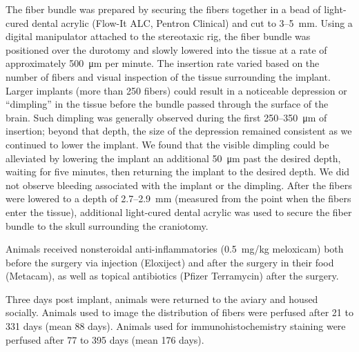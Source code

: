The fiber bundle was prepared by securing the fibers together in a 
bead of light-cured 
dental acrylic (Flow-It ALC, Pentron Clinical) and cut to 3--5~mm. Using 
a digital manipulator attached to the stereotaxic rig, the fiber bundle 
was positioned over the durotomy and slowly lowered into the tissue at 
a rate of approximately 500~\si{\micro\meter} per minute. The insertion rate varied 
based on the number of fibers and visual inspection of the tissue 
surrounding the implant. Larger implants (more than 250 fibers) could 
result in a noticeable depression or ``dimpling'' in the tissue before 
the bundle passed through the surface of the brain. Such dimpling was 
generally observed during the first 250--350~\si{\micro\meter} of 
insertion; beyond that depth, the size of the depression remained 
consistent as we continued to lower the implant. We found that the 
visible dimpling could be alleviated by lowering the implant an 
additional 50~\si{\micro\meter} past the desired depth, waiting for five 
minutes, then returning the implant to the desired depth. We did not 
observe bleeding 
associated with the implant or the dimpling. After the fibers 
were lowered to a depth of 2.7--2.9~mm (measured from the point when the 
fibers enter the tissue), additional light-cured dental acrylic was used 
to secure the fiber bundle to the skull surrounding the craniotomy. 

Animals received nonsteroidal anti-inflammatories (0.5~mg/kg meloxicam) 
both before the surgery via injection (Eloxiject) and after the surgery 
in their food (Metacam), as well as topical antibiotics 
(Pfizer Terramycin) after the surgery.

Three days post implant, animals were returned to the aviary and housed 
socially. Animals used to image the distribution of fibers were perfused 
after 21 to 331 days (mean 88 days). Animals used for 
immunohistochemistry staining were perfused after 77 to 395 days 
(mean 176 days).

